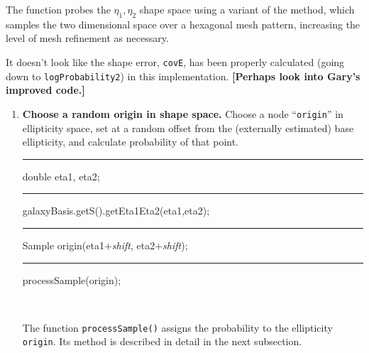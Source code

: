 \documentclass[useAMS,usenatbib,usegraphicx]{mn2e}
\begin{document}
The function probes the $\eta_1, \eta_2$ shape space using a variant of the 
\citet{miller/etal:2007} method, which samples the two dimensional space over a hexagonal 
mesh pattern, increasing the level of mesh refinement as necessary.

It doesn't look like the shape error, {\tt covE}, has been properly calculated (going down to
{\tt logProbability2}) in this implementation.  {\bf [Perhaps look into Gary's improved code.]}

\begin{enumerate}
 \item {\bf Choose a random origin in shape space.} 
Choose a node ``{\tt origin}'' in ellipticity space, set at a random offset from the 
(externally estimated) base ellipticity, and calculate probability of that point. \\
\begin{boxit}
  {\tt \rule{0.1in}{0in} double eta1, eta2;  \\
  \rule{0.1in}{0in} galaxyBasis.getS().getEta1Eta2(eta1,eta2);\\
  \rule{0.1in}{0in} Sample origin(eta1+{\it shift}, eta2+{\it shift});\\
  \rule{0.1in}{0in} processSample(origin); } \\
\end{boxit}
The function \texttt{processSample()} assigns the probability to the ellipticity {\tt origin}.
Its method is described in detail in the next subsection.


\end{enumerate}
\end{document}
